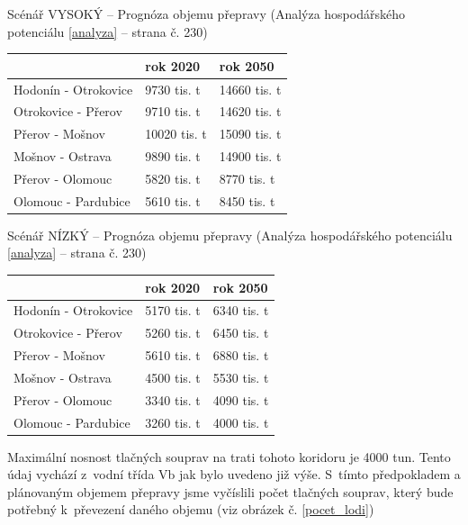 \documentclass[11pt,a4paper]{article}
\begin{document}
      \noindent 
      Scénář VYSOKÝ -- Prognóza objemu přepravy (Analýza hospodářského
      potenciálu \ref{analyza} -- strana č. 230)
      \begin{center}
        \begin{tabular}{| l | l | l |}
          \hline
          & rok 2020 & rok 2050 \\ \hline
          Hodonín - Otrokovice & 9730 tis. t & 14660 tis. t \\ \hline
          Otrokovice - Přerov & 9710 tis. t & 14620 tis. t \\ \hline
          Přerov - Mošnov & 10020 tis. t & 15090 tis. t \\ \hline
          Mošnov - Ostrava & 9890 tis. t & 14900 tis. t \\ \hline
          Přerov - Olomouc & 5820 tis. t & 8770 tis. t \\ \hline
          Olomouc - Pardubice & 5610 tis. t & 8450 tis. t \\ \hline
          \end{tabular}
      \end{center}

      \noindent 
      Scénář NÍZKÝ -- Prognóza objemu přepravy (Analýza hospodářského
      potenciálu \ref{analyza} -- strana č. 230)
      \begin{center}
        \begin{tabular}{| l | l | l |}
          \hline
          & rok 2020 & rok 2050 \\ \hline
          Hodonín - Otrokovice & 5170 tis. t & 6340 tis. t \\ \hline
          Otrokovice - Přerov & 5260 tis. t & 6450 tis. t \\ \hline
          Přerov - Mošnov & 5610 tis. t & 6880 tis. t \\ \hline
          Mošnov - Ostrava & 4500 tis. t & 5530 tis. t \\ \hline
          Přerov - Olomouc & 3340 tis. t & 4090 tis. t \\ \hline
          Olomouc - Pardubice & 3260 tis. t & 4000 tis. t \\ \hline
          \end{tabular}
      \end{center}

      Maximální nosnost tlačných souprav na trati tohoto koridoru je 4000 tun.
      Tento údaj vychází z~vodní třída Vb jak bylo uvedeno již výše.
      S~tímto předpokladem a plánovaným objemem přepravy jsme vyčíslili počet
      tlačných souprav, který bude potřebný k~převezení daného objemu (viz
      obrázek č. \ref{pocet_lodi})
\end{document}
